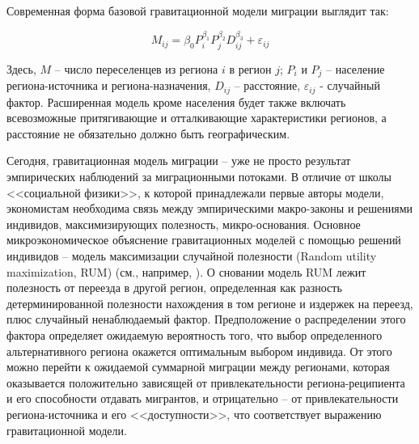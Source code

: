 \documentclass[a4paper,12pt]{article}
\begin{document}
Современная форма базовой гравитационной модели миграции выглядит так:

\begin{equation}\label{eq:base}
	M_{ij} = \beta_0 P^{\beta_1}_{i} P^{\beta_2}_{j} D^{\beta_3}_{ij} + \varepsilon_{ij}
\end{equation}

Здесь, $M$ – число переселенцев из региона $i$ в регион $j$; $P_i$ и $P_j$ – население региона-источника и региона-назначения, $D_{ij}$ – расстояние, $\varepsilon_{ij}$ - случайный фактор. Расширенная модель кроме населения будет также включать всевозможные притягивающие и отталкивающие характеристики регионов, а расстояние не обязательно должно быть географическим.

Сегодня, гравитационная модель миграции -- уже не просто результат эмпирических наблюдений за миграционными потоками. В отличие от школы <<социальной физики>>, к которой принадлежали первые авторы модели, экономистам необходима связь между эмпирическими макро-законы и решениями индивидов, максимизирующих полезность, микро-основания. 
Основное микроэкономическое объяснение гравитационных моделей с помощью решений индивидов – модель максимизации случайной полезности (Random utility maximization, RUM) (см., например, \cite{beine_practitioners_2016}).
О сновании модель RUM лежит полезность от переезда в другой регион, определенная как разность детерминированной полезности нахождения в том регионе и издержек на переезд, плюс случайный ненаблюдаемый фактор. Предположение о распределении этого фактора определяет ожидаемую вероятность того, что выбор определенного альтернативного региона окажется оптимальным выбором индивида. От этого можно перейти к ожидаемой суммарной миграции между регионами, которая оказывается положительно зависящей от привлекательности региона-реципиента и его способности отдавать мигрантов, и отрицательно -- от привлекательности региона-источника и его <<доступности>>, что соответствует выражению гравитационной модели.
\end{document}
